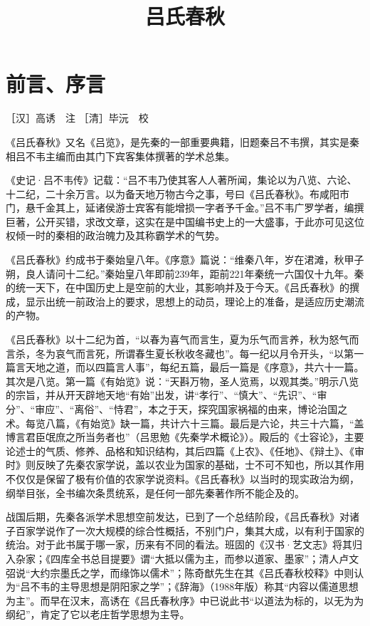 \documentclass[12pt,UTF8]{ctexbook}
\title{\heiti\zihao{0} 吕氏春秋}
\author{}
\date{}
\begin{document}
\maketitle
\tableofcontents

\frontmatter
\chapter{前言、序言}

［汉］高诱　注
［清］毕沅　校

《吕氏春秋》又名《吕览》，是先秦的一部重要典籍，旧题秦吕不韦撰，其实是秦相吕不韦主编而由其门下宾客集体撰著的学术总集。

《史记·吕不韦传》记载：“吕不韦乃使其客人人著所闻，集论以为八览、六论、十二纪，二十余万言。以为备天地万物古今之事，号曰《吕氏春秋》。布咸阳市门，悬千金其上，延诸侯游士宾客有能增损一字者予千金。”吕不韦广罗学者，编撰巨著，公开买错，求改文章，这实在是中国编书史上的一大盛事，于此亦可见这位权倾一时的秦相的政治魄力及其称霸学术的气势。

《吕氏春秋》约成书于秦始皇八年。《序意》篇说：“维秦八年，岁在涒滩，秋甲子朔，良人请问十二纪。”秦始皇八年即前239年，距前221年秦统一六国仅十九年。秦的统一天下，在中国历史上是空前的大业，其影响并及于今天。《吕氏春秋》的撰成，显示出统一前政治上的要求，思想上的动员，理论上的准备，是适应历史潮流的产物。

《吕氏春秋》以十二纪为首，“以春为喜气而言生，夏为乐气而言养，秋为怒气而言杀，冬为哀气而言死，所谓春生夏长秋收冬藏也”。每一纪以月令开头，“以第一篇言天地之道，而以四篇言人事”，每纪五篇，最后一篇是《序意》，共六十一篇。其次是八览。第一篇《有始览》说：“天斟万物，圣人览焉，以观其类。”明示八览的宗旨，并从开天辟地天地“有始”出发，讲“孝行”、“慎大”、“先识”、“审分”、“审应”、“离俗”、“恃君”，本之于天，探究国家祸福的由来，博论治国之术。每览八篇，《有始览》缺一篇，共计六十三篇。最后是六论，共三十六篇，“盖博言君臣氓庶之所当务者也”（吕思勉《先秦学术概论》）。殿后的《士容论》，主要论述士的气质、修养、品格和知识结构，其后四篇《上农》、《任地》、《辩土》、《审时》则反映了先秦农家学说，盖以农业为国家的基础，士不可不知也，所以其作用不仅仅是保留了极有价值的农家学说资料。《吕氏春秋》以当时的现实政治为纲，纲举目张，全书编次条贯统系，是任何一部先秦著作所不能企及的。

战国后期，先秦各派学术思想空前发达，已到了一个总结阶段，《吕氏春秋》对诸子百家学说作了一次大规模的综合性概括，不别门户，集其大成，以有利于国家的统治。对于此书属于哪一家，历来有不同的看法。班固的《汉书·艺文志》将其归入杂家；《四库全书总目提要》谓“大抵以儒为主，而参以道家、墨家”；清人卢文弨说“大约宗墨氏之学，而缘饰以儒术”；陈奇猷先生在其《吕氏春秋校释》中则认为“吕不韦的主导思想是阴阳家之学”；《辞海》（1988年版）称其“内容以儒道思想为主”。而早在汉末，高诱在《吕氏春秋序》中已说此书“以道法为标的，以无为为纲纪”，肯定了它以老庄哲学思想为主导。
\end{document}
